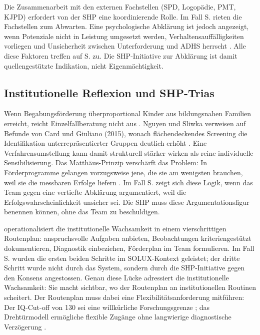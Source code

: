 \documentclass[ngerman, a4paper]{article}
\begin{document}
Die Zusammenarbeit mit den externen Fachstellen (SPD, Logopädie, PMT, KJPD)
erfordert von der SHP eine koordinierende Rolle. Im Fall S. rieten die Fachstellen
zum Abwarten. Eine psychologische Abklärung ist jedoch angezeigt, wenn Potenziale
nicht in Leistung umgesetzt werden, Verhaltensauffälligkeiten vorliegen und
Unsicherheit zwischen Unterforderung und ADHS herrscht
\parencite[vgl.][S.\,234--236]{muelleroppliger2021paeddiagnostik}. Alle diese
Faktoren treffen auf S. zu. Die SHP-Initiative zur Abklärung ist damit
quellengestützte Indikation, nicht Eigenmächtigkeit.

\subsection{Institutionelle Reflexion und SHP-Trias}

Wenn Begabungsförderung überproportional Kinder aus bildungsnahen Familien
erreicht, reicht Einzelfallberatung nicht aus
\parencites[vgl.][S.\,84\psq]{horvath2021elite}
[vgl.][S.\,36,\,40--42]{muelleroppliger2021plurale}. Nguyen und Sliwka
verweisen auf Befunde von Card und Giuliano (2015), wonach flächendeckendes
Screening die Identifikation unterrepräsentierter Gruppen deutlich erhöht
\parencite[vgl.][S.\,355\psq]{nguyensliwka2021massnahmen}. Eine Verfahrensumstellung kann damit strukturell stärker wirken als reine
individuelle Sensibilisierung. Das Matthäus-Prinzip
verschärft das Problem: In Förderprogramme gelangen vorzugsweise jene, die sie am
wenigsten brauchen, weil sie die messbaren Erfolge liefern
\parencite[vgl.][S.\,71\psq]{sedmak2021bildungsgerechtigkeit}. Im Fall S. zeigt
sich diese Logik, wenn das Team gegen eine vertiefte Abklärung argumentiert, weil
die Erfolgswahrscheinlichkeit unsicher sei. Die SHP muss diese Argumentationsfigur
benennen können, ohne das Team zu beschuldigen.

\textcite[S.\,75--80]{ziesenitz2024routenplan} operationalisiert die
institutionelle Wachsamkeit in einem vierschrittigen Routenplan: anspruchsvolle
Aufgaben anbieten, Beobachtungen kriteriengestützt dokumentieren, Diagnostik
einbeziehen, Förderplan im Team formulieren. Im Fall S. wurden die ersten beiden
Schritte im SOLUX-Kontext geleistet; der dritte Schritt wurde nicht durch das
System, sondern durch die SHP-Initiative gegen den Konsens angestossen. Genau
diese Lücke adressiert die institutionelle Wachsamkeit: Sie macht sichtbar, wo
der Routenplan an institutionellen Routinen scheitert. Der Routenplan muss
dabei eine Flexibilitätsanforderung mitführen: Der IQ-Cut-off von 130 sei eine
willkürliche Forschungsgrenze
\parencite[vgl.][S.\,245\psq]{gauckreimann2021psychdiagnostik}; das Drehtürmodell
ermögliche flexible Zugänge ohne langwierige diagnostische Verzögerung
\parencite[vgl.][S.\,342]{reisrenzullimueller2021sem}.
\end{document}
